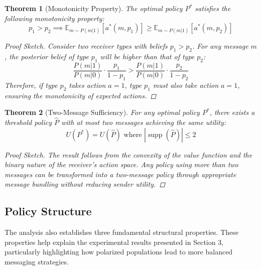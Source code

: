 \documentclass[12pt]{article}
\theoremstyle{plain}
\newtheorem{theorem}{Theorem}[section]
\theoremstyle{definition}
\theoremstyle{remark}
\DeclareMathOperator{\supp}{supp}
\newcommand{\prob}[2]{P(#1|#2)}
\newcommand{\expect}[2]{\mathbb{E}_{#1}\left[#2\right]}
\begin{document}
\begin{theorem}[Monotonicity Property]
The optimal policy $P^*$ satisfies the following monotonicity property:
\[p_1 > p_2 \implies \expect{m\sim\prob{m}{1}}{a^*(m,p_1)} \geq \expect{m\sim\prob{m}{1}}{a^*(m,p_2)}\]

\begin{proof}[Proof Sketch]
Consider two receiver types with beliefs $p_1 > p_2$. For any message $m$, the posterior belief of type $p_1$ will be higher than that of type $p_2$:
\[\frac{\prob{m}{1}}{\prob{m}{0}} \cdot \frac{p_1}{1-p_1} > \frac{\prob{m}{1}}{\prob{m}{0}} \cdot \frac{p_2}{1-p_2}\]
Therefore, if type $p_2$ takes action $a=1$, type $p_1$ must also take action $a=1$, ensuring the monotonicity of expected actions.
\end{proof}
\end{theorem}

\begin{theorem}[Two-Message Sufficiency]
For any optimal policy $P^*$, there exists a threshold policy $\hat{P}$ with at most two messages achieving the same utility:
\[U(P^*) = U(\hat{P}) \text{ where } |\supp(\hat{P})| \leq 2\]

\begin{proof}[Proof Sketch]
The result follows from the convexity of the value function and the binary nature of the receiver's action space. Any policy using more than two messages can be transformed into a two-message policy through appropriate message bundling without reducing sender utility.
\end{proof}
\end{theorem}

\subsection{Policy Structure}
The analysis also establishes three fundamental structural properties. These properties help explain the experimental results presented in Section 3, particularly highlighting how polarized populations lead to more balanced messaging strategies.
\end{document}
